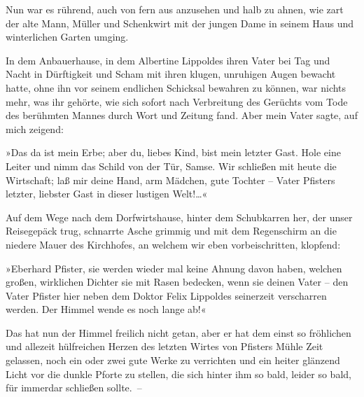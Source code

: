 Nun war es rührend, auch von fern aus anzusehen und halb zu ahnen,
wie zart der alte Mann, Müller und Schenkwirt mit der jungen Dame
in seinem Haus und winterlichen Garten umging.

In dem Anbauerhause, in dem Albertine Lippoldes ihren Vater bei Tag
und Nacht in Dürftigkeit und Scham mit ihren klugen, unruhigen
Augen bewacht hatte, ohne ihn vor seinem endlichen Schicksal
bewahren zu können, war nichts mehr, was ihr gehörte, wie sich
sofort nach Verbreitung des Gerüchts vom Tode des berühmten Mannes
durch Wort und Zeitung fand. Aber mein Vater sagte, auf mich
zeigend:

»Das da ist mein Erbe; aber du, liebes Kind, bist mein letzter
Gast. Hole eine Leiter und nimm das Schild von der Tür, Samse. Wir
schließen mit heute die Wirtschaft; laß mir deine Hand, arm
Mädchen, gute Tochter – Vater Pfisters letzter, liebster Gast in
dieser lustigen Welt!\ldots{}«

Auf dem Wege nach dem Dorfwirtshause, hinter dem Schubkarren her,
der unser Reisegepäck trug, schnarrte Asche grimmig und mit dem
Regenschirm an die niedere Mauer des Kirchhofes, an welchem wir
eben vorbeischritten, klopfend:

»Eberhard Pfister, sie werden wieder mal keine Ahnung davon haben,
welchen großen, wirklichen Dichter sie mit Rasen bedecken, wenn sie
deinen Vater – den Vater Pfister hier neben dem Doktor Felix
Lippoldes seinerzeit verscharren werden. Der Himmel wende es noch
lange ab!«

Das hat nun der Himmel freilich nicht getan, aber er hat dem einst
so fröhlichen und allezeit hülfreichen Herzen des letzten Wirtes
von Pfisters Mühle Zeit gelassen, noch ein oder zwei gute Werke zu
verrichten und ein heiter glänzend Licht vor die dunkle Pforte zu
stellen, die sich hinter ihm so bald, leider so bald, für immerdar
schließen sollte.~–

